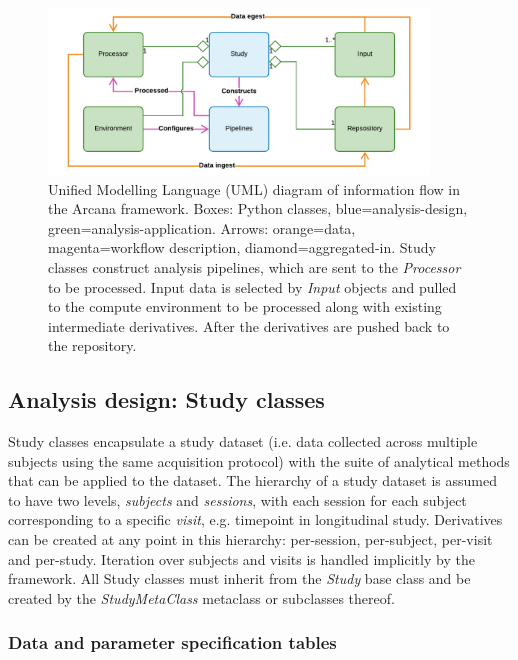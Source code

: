 \documentclass[smallextended]{svjour3}       %
\begin{document}
\begin{figure}
    \centering
    \includegraphics[width=0.9\textwidth]{../figures/simplified_arcana_uml}
  \caption{Unified Modelling Language (UML) diagram
of information flow in the Arcana framework. Boxes: Python classes,
blue=analysis-design, green=analysis-application. Arrows: orange=data,
magenta=workflow description, diamond=aggregated-in. Study classes
construct analysis pipelines, which are sent to the \emph{Processor} to
be processed. Input data is selected by \emph{Input} objects and
pulled to the compute environment to be processed along with existing
intermediate derivatives. After the derivatives are pushed back to the
repository.}
\label{fig:simple_uml}
\end{figure}

\subsection*{Analysis design: Study classes}
\label{analysis-design-study-classes}

Study classes encapsulate a study dataset (i.e. data collected across
multiple subjects using the same acquisition protocol) with the suite of
analytical methods that can be applied to the dataset. The hierarchy of
a study dataset is assumed to have two levels, \emph{subjects} and
\emph{sessions}, with each session for each subject corresponding to a
specific \emph{visit}, e.g. timepoint in longitudinal study. Derivatives
can be created at any point in this hierarchy: per-session, per-subject,
per-visit and per-study. Iteration over subjects and visits is handled
implicitly by the framework. All Study classes must inherit from the
\emph{Study} base class and be created by the \emph{StudyMetaClass}
metaclass or subclasses thereof.

\subsubsection*{Data and parameter specification
tables}
\label{sec:data-and-parameter-specification-tables}
\end{document}
